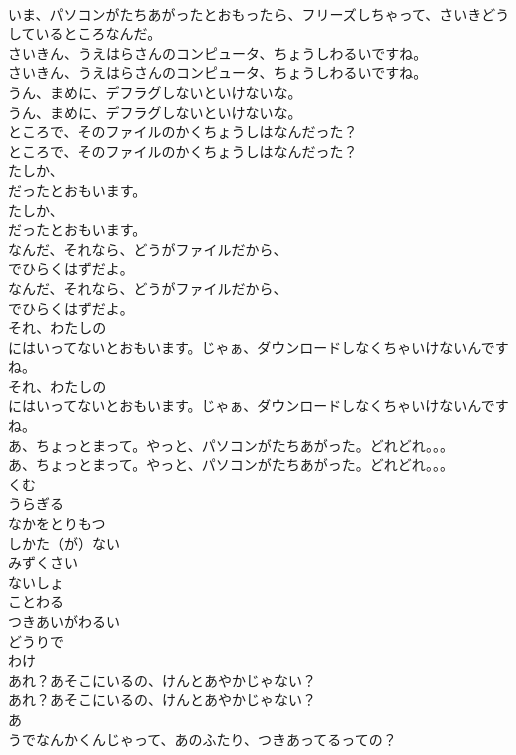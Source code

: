 \documentclass[8pt]{extreport}
\begin{document}
\begin{CJK}{UTF8}{min}
\\	いま、パソコンがたちあがったとおもったら、フリーズしちゃって、さいきどうしているところなんだ。
\\	さいきん、うえはらさんのコンピュータ、ちょうしわるいですね。
\\	さいきん、うえはらさんのコンピュータ、ちょうしわるいですね。
\\	うん、まめに、デフラグしないといけないな。
\\	うん、まめに、デフラグしないといけないな。
\\	ところで、そのファイルのかくちょうしはなんだった？
\\	ところで、そのファイルのかくちょうしはなんだった？
\\	たしか、
\\	だったとおもいます。
\\	たしか、
\\	だったとおもいます。
\\	なんだ、それなら、どうがファイルだから、
\\	でひらくはずだよ。
\\	なんだ、それなら、どうがファイルだから、
\\	でひらくはずだよ。
\\	それ、わたしの
\\	にはいってないとおもいます。じゃぁ、ダウンロードしなくちゃいけないんですね。
\\	それ、わたしの
\\	にはいってないとおもいます。じゃぁ、ダウンロードしなくちゃいけないんですね。
\\	あ、ちょっとまって。やっと、パソコンがたちあがった。どれどれ。。。
\\	あ、ちょっとまって。やっと、パソコンがたちあがった。どれどれ。。。
\\	くむ
\\	うらぎる
\\	なかをとりもつ
\\	しかた（が）ない
\\	みずくさい
\\	ないしょ
\\	ことわる
\\	つきあいがわるい
\\	どうりで
\\	わけ
\\	あれ？あそこにいるの、けんとあやかじゃない？
\\	あれ？あそこにいるの、けんとあやかじゃない？
\\	あ
\\	うでなんかくんじゃって、あのふたり、つきあってるっての？

\end{CJK}
\end{document}
